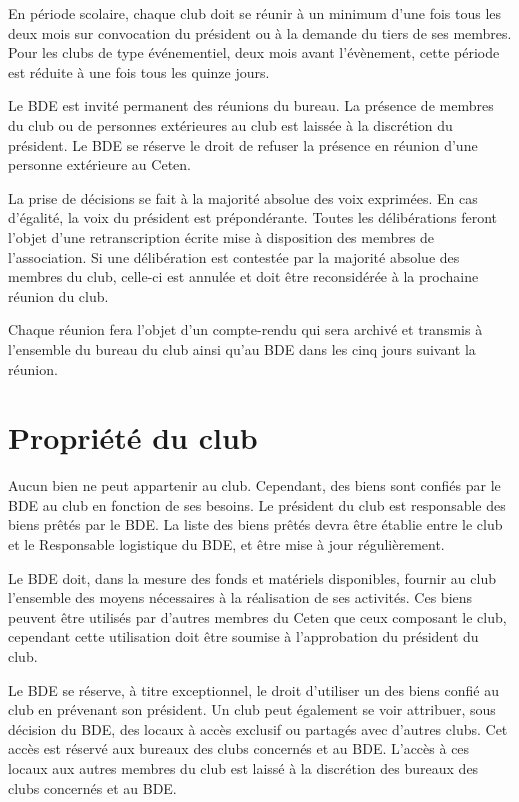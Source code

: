 \documentclass{article}
\begin{document}
\begin{multicols}{2}
		{\small
		
			En période scolaire, chaque club doit se réunir à un minimum d’une
			fois tous les deux mois sur convocation du président ou à la demande
			du tiers de ses membres. Pour les clubs de type événementiel, deux
			mois avant l’évènement, cette période est réduite à une fois tous
			les quinze jours.

			Le BDE est invité permanent des réunions du bureau. La présence de
			membres du club ou de personnes extérieures au club est laissée à la
			discrétion du président. Le BDE se réserve le droit de refuser la
			présence en réunion d'une personne extérieure au Ceten.

			La prise de décisions se fait à la majorité absolue des voix
			exprimées. En cas d’égalité, la voix du président est prépondérante.
			Toutes les délibérations feront l’objet d’une retranscription écrite
			mise à disposition des membres de l’association. Si une délibération
			est contestée par la majorité absolue des membres du club, celle-ci
			est annulée et doit être reconsidérée à la prochaine réunion du
			club.

			Chaque réunion fera l’objet d’un compte-rendu qui sera archivé et
			transmis à l'ensemble du bureau du club ainsi qu'au BDE dans les
			cinq jours suivant la réunion.
			
		}

		\section{Propriété du club}
\label{sec:propriete_du_club}

		{\small

			Aucun bien ne peut appartenir au club. Cependant, des biens sont
			confiés par le BDE au club en fonction de ses besoins. Le président
			du club est responsable des biens prêtés par le BDE\@. La liste des
			biens prêtés devra être établie entre le club et le Responsable
			logistique du BDE, et être mise à jour régulièrement.

			Le BDE doit, dans la mesure des fonds et matériels disponibles,
			fournir au club l’ensemble des moyens nécessaires à la réalisation
			de ses activités. Ces biens peuvent être utilisés par d’autres
			membres du Ceten que ceux composant le club, cependant cette
			utilisation doit être soumise à l’approbation du président du club.

			Le BDE se réserve, à titre exceptionnel, le droit d’utiliser un des
			biens confié au club en prévenant son président. Un club peut
			également se voir attribuer, sous décision du BDE, des locaux à
			accès exclusif ou partagés avec d’autres clubs. Cet accès est
			réservé aux bureaux des clubs concernés et au BDE\@. L’accès à ces
			locaux aux autres membres du club est laissé à la discrétion des
			bureaux des clubs concernés et au BDE\@.

}
\end{multicols}
\end{document}
